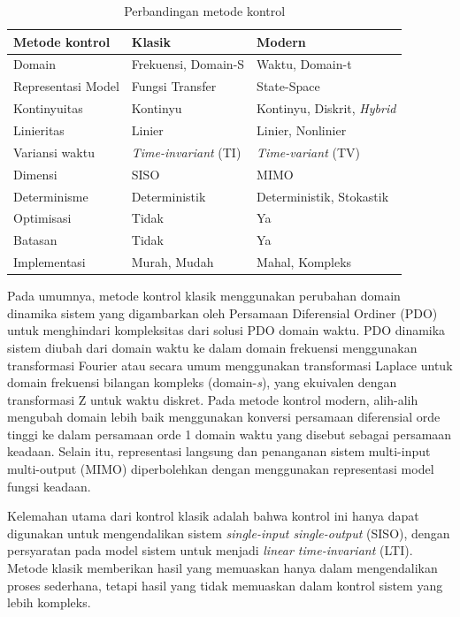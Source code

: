 \begin{table}[!h]
	\caption{Perbandingan metode kontrol}
	\label{tbl:3:whyann}
	\centering
	\begin{tabular}{|p{4cm}|p{4cm}|p{4.5cm}|}
		\hline
		\textbf{Metode kontrol} & \textbf{Klasik} & \textbf{Modern} \\ 
		\hline
		Domain & Frekuensi, Domain-S & Waktu, Domain-t \\ 
		\hline
		Representasi Model & Fungsi Transfer & State-Space \\ 
		\hline
		Kontinyuitas & Kontinyu & Kontinyu, Diskrit, \textit{Hybrid} \\ 
		\hline
		Linieritas & Linier & Linier, Nonlinier \\ 
		\hline
		Variansi waktu & \textit{Time-invariant} (TI) & \textit{Time-variant} (TV) \\ 
		\hline
		Dimensi & SISO & MIMO \\ 
		\hline
		Determinisme & Deterministik & Deterministik, Stokastik \\ 
		\hline
		Optimisasi & Tidak & Ya \\ 
		\hline
		Batasan & Tidak & Ya \\ 
		\hline
		Implementasi & Murah, Mudah & Mahal, Kompleks \\ 
		\hline
	\end{tabular}
\end{table}

Pada umumnya, metode kontrol klasik menggunakan perubahan domain dinamika sistem yang digambarkan oleh Persamaan Diferensial Ordiner (PDO) untuk menghindari kompleksitas dari solusi PDO domain waktu. PDO dinamika sistem diubah dari domain waktu ke dalam domain frekuensi menggunakan transformasi Fourier atau secara umum menggunakan transformasi Laplace untuk domain frekuensi bilangan kompleks (domain-\textit{s}), yang ekuivalen dengan transformasi Z untuk waktu diskret. Pada metode kontrol modern, alih-alih mengubah domain lebih baik menggunakan konversi persamaan diferensial orde tinggi ke dalam persamaan orde 1 domain waktu yang disebut sebagai persamaan keadaan. Selain itu, representasi langsung dan penanganan sistem multi-input multi-output (MIMO) diperbolehkan dengan menggunakan representasi model fungsi keadaan. \cite{MPCDissertation}

Kelemahan utama dari kontrol klasik adalah bahwa kontrol ini hanya dapat digunakan untuk mengendalikan sistem \textit{single-input single-output} (SISO), dengan persyaratan pada model sistem untuk menjadi \textit{linear time-invariant} (LTI). Metode klasik memberikan hasil yang memuaskan hanya dalam mengendalikan proses sederhana, tetapi hasil yang tidak memuaskan dalam kontrol sistem yang lebih kompleks. \cite{MPCDissertation}

